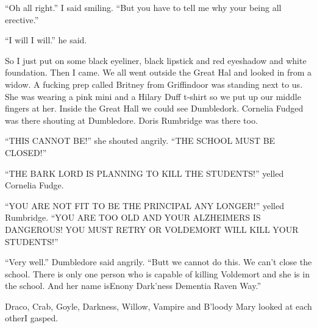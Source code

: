 \enquote{Oh all right.} I said smiling. \enquote{But you have to tell me why your being all erective.}

\enquote{I will I will.} he said.

So I just put on some black eyeliner, black lipstick and red eyeshadow and white foundation. Then I came. We all went outside the Great Hal and looked in from a widow. A fucking prep called Britney from Griffindoor was standing next to us. She was wearing a pink mini and a Hilary Duff t-shirt so we put up our middle fingers at her. Inside the Great Hall we could see Dumbledork. Cornelia Fudged was there shouting at Dumbledore. Doris Rumbridge was there too.

\enquote{THIS CANNOT BE\@!} she shouted angrily. \enquote{THE SCHOOL MUST BE CLOSED\@!}

\begin{sloppypar}
    \enquote{THE BARK LORD IS PLANNING TO KILL THE STU\-DENTS\@!} yelled Cornelia Fudge.
\end{sloppypar}

\begin{sloppypar}
    \enquote{YOU ARE NOT FIT TO BE THE PRINCIPAL ANY LONGER\@!} yelled Rumbridge. \enquote{YOU ARE TOO OLD AND YOUR ALZ\-HEIMERS IS DANGEROUS\@! YOU MUST RETRY OR VOL\-DE\-MORT WILL KILL YOUR STUDENTS\@!}
\end{sloppypar}

\enquote{Very well.} Dumbledore said angrily. \enquote{Butt we cannot do this. We can't close the school. There is only one person who is capable of killing Voldemort and she is in the school. And her name is\dotfill\newline\phantom{}\dotfill Enony Dark'ness Dementia Raven Way.} 

Draco, Crab, Goyle, Darkness, Willow, Vampire and B'loody Mary looked at each other\dotfill I gasped.

